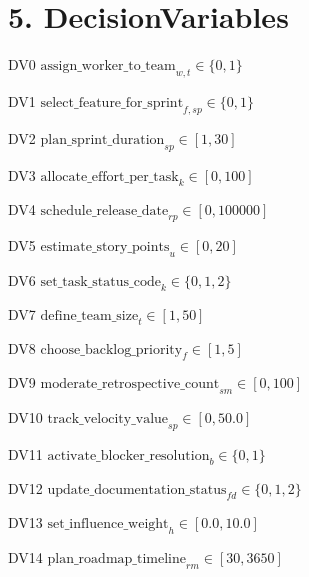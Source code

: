 \documentclass[12pt]{article}
\begin{document}
\section{5. DecisionVariables}
\item[DV0] $\text{assign\_worker\_to\_team}_{w,t} \in \{0,1\}$
    \item[DV1] $\text{select\_feature\_for\_sprint}_{f,sp} \in \{0,1\}$
    \item[DV2] $\text{plan\_sprint\_duration}_{sp} \in [1,30]$
    \item[DV3] $\text{allocate\_effort\_per\_task}_{k} \in [0,100]$
    \item[DV4] $\text{schedule\_release\_date}_{rp} \in [0,100000]$
    \item[DV5] $\text{estimate\_story\_points}_{u} \in [0,20]$
    \item[DV6] $\text{set\_task\_status\_code}_{k} \in \{0,1,2\}$
    \item[DV7] $\text{define\_team\_size}_{t} \in [1,50]$
    \item[DV8] $\text{choose\_backlog\_priority}_{f} \in [1,5]$
    \item[DV9] $\text{moderate\_retrospective\_count}_{sm} \in [0,100]$
    \item[DV10] $\text{track\_velocity\_value}_{sp} \in [0,50.0]$
    \item[DV11] $\text{activate\_blocker\_resolution}_{b} \in \{0,1\}$
    \item[DV12] $\text{update\_documentation\_status}_{fd} \in \{0,1,2\}$
    \item[DV13] $\text{set\_influence\_weight}_{h} \in [0.0,10.0]$
    \item[DV14] $\text{plan\_roadmap\_timeline}_{rm} \in [30,3650]$
\end{document}
